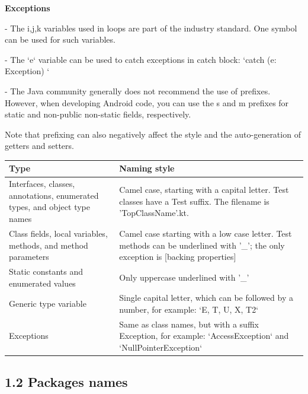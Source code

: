 \textbf{Exceptions}

- The i,j,k variables used in loops are part of the industry standard. One symbol can be used for such variables.

- The `e` variable can be used to catch exceptions in catch block: `catch (e: Exception) {}`

- The Java community generally does not recommend the use of prefixes. However, when developing Android code, you can use the s and m prefixes for static and non-public non-static fields, respectively.

Note that prefixing can also negatively affect the style and the auto-generation of getters and setters.



\begin{center}

\begin{tabular}{ |p{}|p{}| }

\hline

Type&Naming style\\

\hline

 Interfaces, classes, annotations, enumerated types, and object type names & Camel case, starting with a capital letter. Test classes have a Test suffix. The filename is 'TopClassName'.kt.  \\

 Class fields, local variables, methods, and method parameters & Camel case starting with a low case letter. Test methods can be underlined with '\_'; the only exception is [backing properties]\\

 Static constants and enumerated values & Only uppercase underlined with '\_' \\

 Generic type variable & Single capital letter, which can be followed by a number, for example: `E, T, U, X, T2` \\

 Exceptions & Same as class names, but with a suffix Exception, for example: `AccessException` and `NullPointerException`\\

\hline

\end{tabular}

\end{center}

\subsection*{\textbf{1.2 Packages names}}


